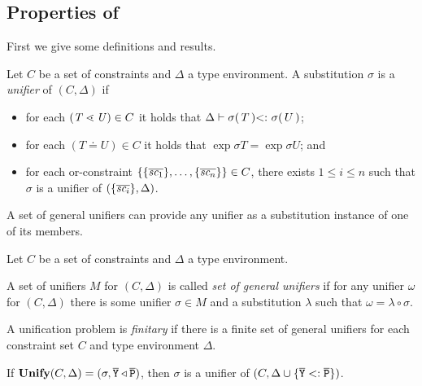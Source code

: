 \subsection{Properties of \unify{}}
\label{sec:properties-unify}

First we give some definitions and results.

\begin{definition}[Unifier]
  Let $C$ be a set of constraints and $\Delta$ a type environment.
  A substitution $\sigma$  is a \emph{unifier} of $(C,\Delta)$ if
  \begin{itemize}
  \item for each $(\mathit{T} \lessdot \mathit{U}) \in C$ it holds that
    $\Delta \vdash \sigma(\,T\,) \textrm{$<:$}\  \sigma(\,U\,)$;
  \item  for each $(T \doteq U) \in C$ it holds that
    $\exp{\sigma}{T} = \exp{\sigma}{U}$; and
  \item for each or-constraint $\{ \{ \overline{\textit{sc}_1} \},
      \ldots, \{ \overline{\textit{sc}_n} \} \} \in C$, there exists $1
    \le i \le n$ such that $\sigma$ is a unifier of
    $(\{ \overline{\textit{sc}_i} \}, \Delta)$. 
  \end{itemize}
\end{definition}

A set of general unifiers can provide any unifier as a substitution
instance of one of its members.
\begin{definition}
  Let $C$ be a set of constraints and $\Delta$ a type environment. 

  A set of unifiers $M$ for $(C, \Delta)$
  is called \emph{set of general unifiers} if for any unifier $\omega$
  for $(C, \Delta)$ there is some unifier $\sigma \in M$ and a substitution
  $\lambda$ such that $\omega = \lambda   \circ \sigma$.
\end{definition}

A unification problem is \emph{finitary} if there is a finite set of
general unifiers for each constraint set $C$ and type environment $\Delta$.

\begin{theorem}[Soundness]
  \label{theo:unifySoundness}
   If $\textbf{Unify}{}(C, \Delta) = {(\sigma,  \overline{\tt Y} \triangleleft
     \overline{\tt P})}$, then $\sigma$ is a unifier of $(C,\Delta \cup \{ \overline{\tt Y} <: \overline{\tt P} \})$. 
\end{theorem}

